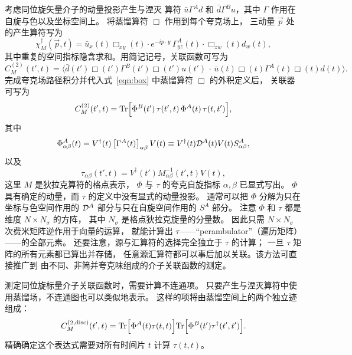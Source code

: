 考虑同位旋矢量介子的动量投影产生与湮灭
算符 $\bar{u} \Gamma^A d$ 和
$\bar{d} \Gamma^B u$，其中 $\Gamma$ 作用在自旋与色以及坐标空间上。
将蒸馏算符 $\Box$ 作用到每个夸克场上，
三动量 $\vec{p}$ 处的产生算符写为
\begin{equation}
\chi^\dagger_M(\vec{p},t)
  = \bar{u}_x(t) \Box_{xy}(t) \cdot e^{-i p\cdot y}\, \Gamma^A_{yz}(t) \cdot \Box_{zw}(t) d_w(t),
\label{eqn:meson_quark_op}
\end{equation}
其中重复的空间指标隐含求和。用简记记号，关联函数可写为
\begin{equation}
  C^{(2)}_M(t',t) = \Big\langle \bar{d}(t')\Box(t')\Gamma^B(t')\Box(t')u(t')\,\cdot\,
                      \bar{u}(t)\Box(t)\Gamma^A(t)\Box(t) d(t)
    \Big\rangle.
\end{equation}
完成夸克场路径积分并代入式~\ref{eqn:box} 中蒸馏算符 $\Box$ 的外积定义后，
关联器可写为
\begin{equation}
  C^{(2)}_M(t',t) = \mbox{Tr} \Bigl[
      \Phi^B(t') \,
      \tau(t',t) \,\Phi^A(t) \, \tau(t,t') \Bigr],
\end{equation}
其中
\begin{equation}
  \Phi^A_{\alpha\beta}(t) = V^\dagger(t) \left[ \Gamma^A(t) \right]_{\alpha\beta} V(t)
  \equiv V^\dagger(t) {\cal D}^A(t) V(t) S^A_{\alpha\beta} ,
\label{eqn:meson_op}
\end{equation}
以及
\begin{equation}
  \tau_{\alpha\beta }(t',t) = V^\dagger(t') M^{-1}_{\alpha\beta}(t',t) V(t),
\label{eqn:peram}
\end{equation}
这里 $M$ 是狄拉克算符的格点表示，
$\Phi$ 与 $\tau$ 的夸克自旋指标 $\alpha,\beta$ 已显式写出。
$\Phi$ 具有确定的动量，而 $\tau$ 的定义中没有显式的动量投影。
通常可以把 $\Phi$ 分解为只在坐标与色空间作用的 ${\cal
D}^A$ 部分与只在自旋空间作用的 $S^{A}$ 部分。
注意 $\Phi$ 和 $\tau$ 都是维度 $N \times N_\sigma$ 的方阵，
其中 $N_\sigma$ 是格点狄拉克旋量的分量数。
因此只需 $N \times N_\sigma$ 次费米矩阵逆作用于向量的运算，
就能计算出 $\tau$——``perambulator''（遍历矩阵）——的全部元素。
还要注意，源与汇算符的选择完全独立于 $\tau$ 的计算；
一旦 $\tau$ 矩阵的所有元素都已算出并存储，
任意源汇算符都可以事后加以关联。该方法可直接推广到
由不同、非简并夸克味组成的介子关联函数的测定。

测定同位旋标量介子关联函数时，需要计算不连通项。
只要产生与湮灭算符中使用蒸馏场，不连通图也可以类似地表示。
这样的项将由蒸馏空间上的两个独立迹组成：
\begin{equation}
  C^{(2,\mathrm{disc})}_M(t',t) =
   \mbox{Tr}\Bigl[ \Phi^A(t) \tau(t,t) \Bigr]
   \mbox{Tr}\Bigl[ \Phi^B(t') \tau^\dagger(t' ,t') \Bigr].
\end{equation}
精确确定这个表达式需要对所有时间片 $t$ 计算 $\tau(t,t)$。

